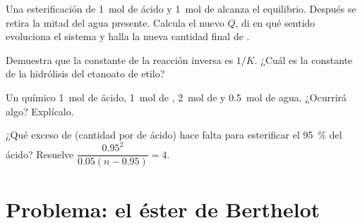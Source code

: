 \begin{exercise}[$\star\star\star$]\label{exo:g12:equilibrium:12}
Una esterificación de \qty{1}{mol} de ácido y \qty{1}{mol} de 
alcanza el equilibrio. Después se retira la mitad del agua presente.
Calcula el nuevo $Q$, di en qué sentido evoluciona el sistema y halla la
nueva cantidad final de .
\end{exercise}

\begin{exercise}[$\star\star\star$]\label{exo:g12:equilibrium:13}
Demuestra que la constante de la reacción inversa es $1/K$. ¿Cuál es la
constante de la hidrólisis del etanoato de etilo?
\end{exercise}

\begin{exercise}[$\star\star\star$]\label{exo:g12:equilibrium:14}
Un químico  \qty{1}{mol} de ácido, \qty{1}{mol} de ,
\qty{2}{mol} de  y \qty{0.5}{mol} de agua. ¿Ocurrirá algo?
Explícalo.
\end{exercise}

\begin{exercise}[$\star\star\star$]\label{exo:g12:equilibrium:15}
¿Qué exceso de  (cantidad por  de ácido) hace falta para
esterificar el \qty{95}{\percent} del ácido? Resuelve $\dfrac{0.95^2}{0.05(n - 0.95)} =
4$.
\end{exercise}

\section{Problema: el éster de Berthelot}

